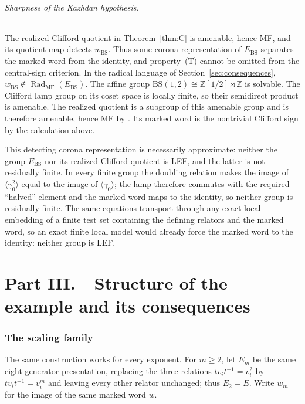 \documentclass[11pt]{amsart}
\newcommand{\leanverified}[2]{\ignorespaces}
\theoremstyle{definition}
\theoremstyle{remark}
\theoremstyle{plain}
\begin{document}
\paragraph{Sharpness of the Kazhdan hypothesis.}
The realized Clifford quotient in Theorem~\ref{thm:C} is amenable,
hence MF, and its quotient map detects $w_{\mathrm{BS}}$.  Thus some
corona representation of $E_{\mathrm{BS}}$ separates the marked word
from the identity, and property~\textup{(T)} cannot be omitted from
the central-sign criterion.  In the radical language of
Section~\ref{sec:consequences},
$w_{\mathrm{BS}}\notin\operatorname{Rad}_{\mathrm{MF}}(E_{\mathrm{BS}})$.
The affine group $\mathrm{BS}(1,2)\cong\mathbb Z[1/2]\rtimes\mathbb Z$ is
solvable.  The Clifford lamp group on its coset space is locally finite, so
their semidirect product is amenable.  The realized quotient is a subgroup
of this amenable group and is therefore amenable, hence MF by \cite{TWW}.
Its marked word is the nontrivial Clifford sign by the calculation above.

This detecting corona representation is necessarily approximate:
neither the group $E_{\mathrm{BS}}$ nor its realized Clifford quotient
is LEF, and the latter is not residually finite.  In every finite
group the doubling relation makes the image of
$\langle\gamma_0^2\rangle$ equal to the image of
$\langle\gamma_0\rangle$; the lamp therefore commutes with the
required ``halved'' element and the marked word maps to the identity,
so neither group is residually finite.  The same equations transport
through any exact local embedding of a finite test set containing the
defining relators and the marked word, so an exact finite local model
would already force the marked word to the identity: neither group is
LEF.
\leanverified{Monsters/CyclicBaseLEFObstruction}{GroupApproximation.CyclicBaseLEFObstruction.cyclicBase_exactModel_package}

\clearpage
\part*{Part III.\ \ Structure of the example and its consequences}

\section{The scaling family}\label{supp:scaling}

The same construction works for every exponent.  For $m\ge2$, let $E_m$ be the same
eight-generator presentation, replacing the three relations
$tv_i t^{-1}=v_i^2$ by $tv_i t^{-1}=v_i^m$ and leaving every other
relator unchanged; thus $E_2=E$.  Write $w_m$ for the image of the same
marked word $w$.
\end{document}
